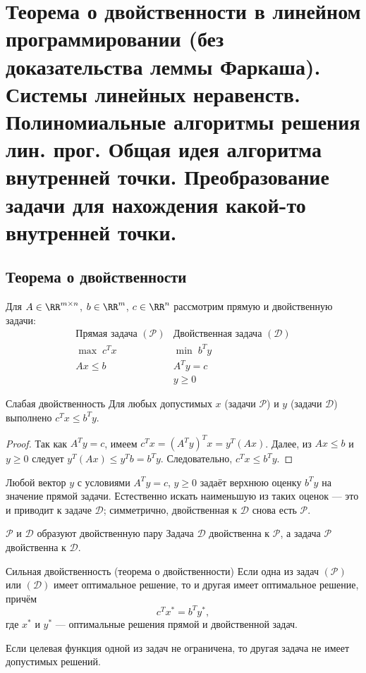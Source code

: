 
\section{Теорема о двойственности в линейном программировании (без доказательства леммы Фаркаша). Системы линейных неравенств. Полиномиальные алгоритмы решения лин. прог. Общая идея алгоритма внутренней точки. Преобразование задачи для нахождения какой-то внутренней точки.}

\subsection{Теорема о двойственности}

Для $A \in \RR^{m \times n}$, $b \in \RR^m$, $c \in \RR^n$ рассмотрим прямую и двойственную задачи:
\[
\begin{array}{c|c}
	\text{Прямая задача } (\mathcal{P}) & \text{Двойственная задача } (\mathcal{D}) \\ \hline
	\max\; c^T x & \min\; b^T y \\
	Ax \le b & A^T y = c \\
	& y \ge 0
\end{array}
\]

\begin{Proposition}{Слабая двойственность}{}
	Для любых допустимых $x$ (задачи $\mathcal{P}$) и $y$ (задачи $\mathcal{D}$) выполнено $c^T x \le b^T y$.
\end{Proposition}

\begin{proof}
	Так как $A^T y = c$, имеем $c^T x = (A^T y)^T x = y^T (Ax)$. Далее, из $Ax \le b$ и $y \ge 0$ следует $y^T (Ax) \le y^T b = b^T y$. Следовательно, $c^T x \le b^T y$.
\end{proof}

Любой вектор $y$ с условиями $A^T y = c$, $y \ge 0$ задаёт верхнюю оценку $b^T y$ на значение прямой задачи. Естественно искать наименьшую из таких оценок --- это и приводит к задаче $\mathcal{D}$; симметрично, двойственная к $\mathcal{D}$ снова есть $\mathcal{P}$.

\begin{Proposition}{$\mathcal{P}$ и $\mathcal{D}$ образуют двойственную пару}{}
	Задача $\mathcal{D}$ двойственна к $\mathcal{P}$, а задача $\mathcal{P}$ двойственна к $\mathcal{D}$.
\end{Proposition}

\begin{Theorem}{Сильная двойственность (теорема о двойственности)}{}
	Если одна из задач $(\mathcal{P})$ или $(\mathcal{D})$ имеет оптимальное решение, то и другая имеет оптимальное решение, причём
	\[
	c^T x^* = b^T y^*,
	\]
	где $x^*$ и $y^*$ --- оптимальные решения прямой и двойственной задач.
	
	\medskip
	Если целевая функция одной из задач не ограничена, то другая задача не имеет допустимых решений.
\end{Theorem}

